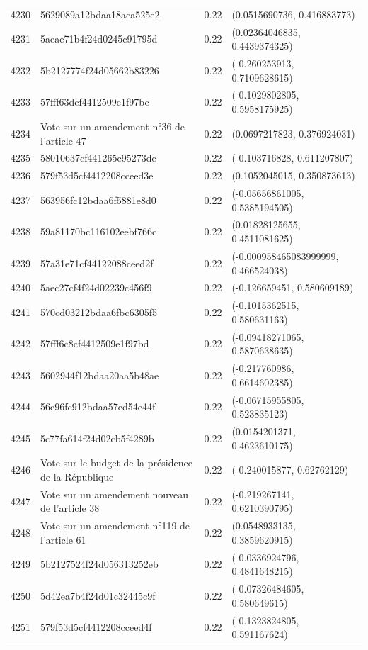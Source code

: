 \begin{table}[ht]
\begin{tabular}{rlrl}
  4230 & 5629089a12bdaa18aca525e2 & 0.22 & (0.0515690736, 0.416883773) \\ 
  4231 & 5aeae71b4f24d0245c91795d & 0.22 & (0.02364046835, 0.4439374325) \\ 
  4232 & 5b2127774f24d05662b83226 & 0.22 & (-0.260253913, 0.7109628615) \\ 
  4233 & 57fff63dcf4412509e1f97bc & 0.22 & (-0.1029802805, 0.5958175925) \\ 
  4234 & Vote sur un amendement n°36 de l'article 47 & 0.22 & (0.0697217823, 0.376924031) \\ 
  4235 & 58010637cf441265c95273de & 0.22 & (-0.103716828, 0.611207807) \\ 
  4236 & 579f53d5cf4412208cceed3e & 0.22 & (0.1052045015, 0.350873613) \\ 
  4237 & 563956fc12bdaa6f5881e8d0 & 0.22 & (-0.05656861005, 0.5385194505) \\ 
  4238 & 59a81170bc116102eebf766c & 0.22 & (0.01828125655, 0.4511081625) \\ 
  4239 & 57a31e71cf44122088ceed2f & 0.22 & (-0.000958465083999999, 0.466524038) \\ 
  4240 & 5aec27cf4f24d02239c456f9 & 0.22 & (-0.126659451, 0.580609189) \\ 
  4241 & 570cd03212bdaa6fbc6305f5 & 0.22 & (-0.1015362515, 0.580631163) \\ 
  4242 & 57fff6c8cf4412509e1f97bd & 0.22 & (-0.09418271065, 0.5870638635) \\ 
  4243 & 5602944f12bdaa20aa5b48ae & 0.22 & (-0.217760986, 0.6614602385) \\ 
  4244 & 56e96fc912bdaa57ed54e44f & 0.22 & (-0.06715955805, 0.523835123) \\ 
  4245 & 5c77fa614f24d02cb5f4289b & 0.22 & (0.0154201371, 0.4623610175) \\ 
  4246 & Vote sur le budget de la présidence de la République & 0.22 & (-0.240015877, 0.62762129) \\ 
  4247 & Vote sur un amendement nouveau de l'article 38 & 0.22 & (-0.219267141, 0.6210390795) \\ 
  4248 & Vote sur un amendement n°119 de l'article 61 & 0.22 & (0.0548933135, 0.3859620915) \\ 
  4249 & 5b2127524f24d056313252eb & 0.22 & (-0.0336924796, 0.4841648215) \\ 
  4250 & 5d42ea7b4f24d01c32445c9f & 0.22 & (-0.07326484605, 0.580649615) \\ 
  4251 & 579f53d5cf4412208cceed4f & 0.22 & (-0.1323824805, 0.591167624) \\ 

\end{tabular}
\end{table}
